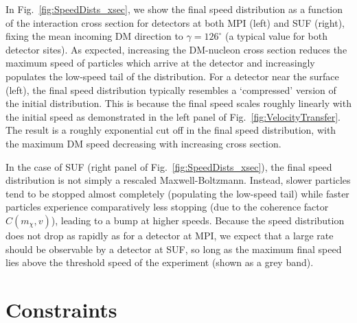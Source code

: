 \documentclass[prd,twocolumn,showpacs,nofootinbib,aps]{revtex4-1}
\newcommand{\Bradley}[1]{\textcolor{red}{\textbf{BJK:} #1}}
\begin{document}
In Fig.~\ref{fig:SpeedDists_xsec}, we show the final speed distribution as a function of the interaction cross section for detectors at both MPI (left) and SUF (right), fixing the mean incoming DM direction to $\gamma = 126^\circ$ (a typical value for both detector sites). As expected, increasing the DM-nucleon cross section reduces the maximum speed of particles which arrive at the detector and increasingly populates the low-speed tail of the distribution. For a detector near the surface (left), the final speed distribution typically resembles a `compressed' version of the initial distribution. This is because the final speed scales roughly linearly with the initial speed as demonstrated in the left panel of Fig.~\ref{fig:VelocityTransfer}. The result is a roughly exponential cut off in the final speed distribution, with the maximum DM speed decreasing with increasing cross section.

In the case of SUF (right panel of Fig.~\ref{fig:SpeedDists_xsec}), the final speed distribution is not simply a rescaled Maxwell-Boltzmann. Instead, slower particles tend to be stopped almost completely (populating the low-speed tail) while faster particles experience comparatively less stopping (due to the coherence factor $C(m_\chi, v)$), leading to a bump at higher speeds. Because the speed distribution does not drop  as rapidly as for a detector at MPI, we expect that a large rate should be observable by a detector at SUF, so long as the maximum final speed lies above the threshold speed of the experiment (shown as a grey band). 






\section{Constraints}
\label{sec:constraints}
\end{document}
